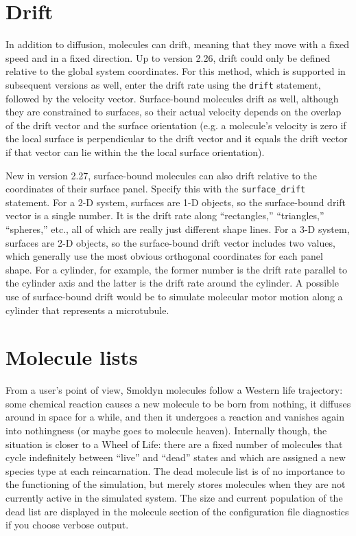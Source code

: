 \documentclass {scrbook}
\newcommand {\ttt} {\texttt}
\begin{document}
\section{Drift}

In addition to diffusion, molecules can drift, meaning that they move with a fixed speed and in a fixed direction. Up to version 2.26, drift could only be defined relative to the global system coordinates. For this method, which is supported in subsequent versions as well, enter the drift rate using the \ttt{drift} statement, followed by the velocity vector. Surface-bound molecules drift as well, although they are constrained to surfaces, so their actual velocity depends on the overlap of the drift vector and the surface orientation (e.g. a molecule's velocity is zero if the local surface is perpendicular to the drift vector and it equals the drift vector if that vector can lie within the the local surface orientation).

New in version 2.27, surface-bound molecules can also drift relative to the coordinates of their surface panel. Specify this with the \ttt{surface\_drift} statement. For a 2-D system, surfaces are 1-D objects, so the surface-bound drift vector is a single number. It is the drift rate along ``rectangles,'' ``triangles,'' ``spheres,'' etc., all of which are really just different shape lines. For a 3-D system, surfaces are 2-D objects, so the surface-bound drift vector includes two values, which generally use the most obvious orthogonal coordinates for each panel shape. For a cylinder, for example, the former number is the drift rate parallel to the cylinder axis and the latter is the drift rate around the cylinder. A possible use of surface-bound drift would be to simulate molecular motor motion along a cylinder that represents a microtubule.

\section{Molecule lists}

From a user's point of view, Smoldyn molecules follow a Western life trajectory: some chemical reaction causes a new molecule to be born from nothing, it diffuses around in space for a while, and then it undergoes a reaction and vanishes again into nothingness (or maybe goes to molecule heaven). Internally though, the situation is closer to a Wheel of Life: there are a fixed number of molecules that cycle indefinitely between ``live'' and ``dead'' states and which are assigned a new species type at each reincarnation. The dead molecule list is of no importance to the functioning of the simulation, but merely stores molecules when they are not currently active in the simulated system. The size and current population of the dead list are displayed in the molecule section of the configuration file diagnostics if you choose verbose output.
\end{document}

